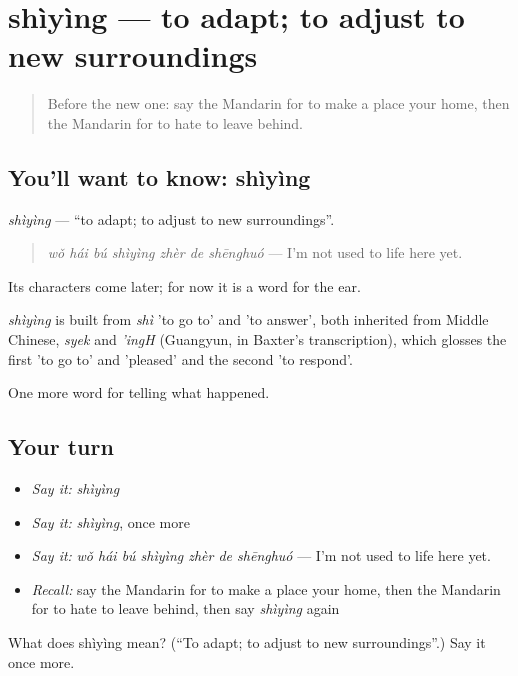 \section[shìyìng]{shìyìng — to adapt; to adjust to new surroundings}

\label{lesson:ZH-C313-shiying}



\begin{quote}
Before the new one: say the Mandarin for to make a place your home, then the Mandarin for to hate to leave behind.
\end{quote}

\subsection*{You'll want to know: shìyìng}
\emph{shìyìng} — \textquotedblleft{}to adapt; to adjust to new surroundings\textquotedblright{}.

\begin{quote}
\emph{wǒ hái bú shìyìng zhèr de shēnghuó} — I'm not used to life here yet.
\end{quote}

Its characters come later; for now it is a word for the ear.

\begin{cousinweb}
\emph{shìyìng} is built from \emph{shì} 'to go to' and  'to answer', both inherited from Middle Chinese, \emph{syek} and \emph{'ingH} (Guangyun, in Baxter's transcription), which glosses the first 'to go to' and 'pleased' and the second 'to respond'.
\end{cousinweb}

\begin{grammarlens}[title={What you've built}]
One more word for telling what happened.
\end{grammarlens}

\subsection*{Your turn}
\begin{itemize}
\raggedright
  \item \emph{Say it:} \emph{shìyìng}
  \item \emph{Say it:} \emph{shìyìng}, once more
  \item \emph{Say it:} \emph{wǒ hái bú shìyìng zhèr de shēnghuó} — I'm not used to life here yet.
  \item \emph{Recall:} say the Mandarin for to make a place your home, then the Mandarin for to hate to leave behind, then say \emph{shìyìng} again
\end{itemize}

\begin{tcolorbox}[breakable,colback=teal!4,colframe=teal!35!black,title={Before you move on}]
What does shìyìng mean? (\textquotedblleft{}To adapt; to adjust to new surroundings\textquotedblright{}.) Say it once more.
\end{tcolorbox}

